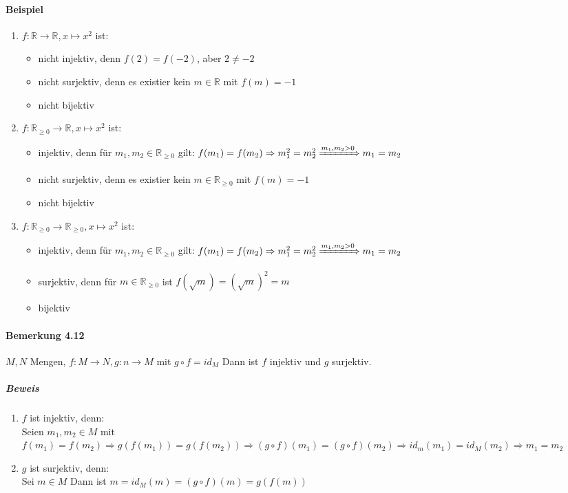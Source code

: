 \documentclass[a4paper]{scrartcl}
\theoremstyle{definition}
\theoremstyle{plain}
\theoremstyle{plain}
\theoremstyle{remark}
\theoremstyle{remark}
\theoremstyle{remark}
\begin{document}
\paragraph{Beispiel}
\label{sec-2-6-7-4}
\begin{enumerate}
\item $f:\mathbb{R}\to\mathbb{R},x\mapsto x^2$ ist:
\begin{itemize}
\item nicht injektiv, denn $f(2) = f(-2)$, aber $2\neq -2$
\item nicht surjektiv, denn es existier kein $m\in\mathbb{R}$ mit $f(m) = -1$
\item nicht bijektiv
\end{itemize}
\item $f:\mathbb{R}_{\geq 0} \to \mathbb{R}, x\mapsto x^2$ ist:
\begin{itemize}
\item injektiv, denn für $m_1,m_2 \in\mathbb{R}_{\geq 0}$ gilt: $f(m_1) = f(m_2) \Rightarrow m_1^2 = m_2^2 \xRightarrow{m_1,m_2 > 0} m_1 = m_2$
\item nicht surjektiv, denn es existier kein $m\in\mathbb{R}_{\geq 0}$ mit $f(m) = -1$
\item nicht bijektiv
\end{itemize}
\item $f:\mathbb{R}_{\geq 0} \to \mathbb{R}_{\geq 0}, x\mapsto x^2$ ist:
\begin{itemize}
\item injektiv, denn für $m_1,m_2 \in\mathbb{R}_{\geq 0}$ gilt: $f(m_1) = f(m_2) \Rightarrow m_1^2 = m_2^2 \xRightarrow{m_1,m_2 > 0} m_1 = m_2$
\item surjektiv, denn für $m\in\mathbb{R}_{\geq 0}$ ist $f(\sqrt{m}) = (\sqrt{m})^2 = m$
\item bijektiv
\end{itemize}
\end{enumerate}
\paragraph{Bemerkung 4.12}
\label{sec-2-6-7-5}
$M,N$ Mengen, $f:M\to N, g:n\to M$ mit $g\circ f = id_M$
Dann ist $f$ injektiv und $g$ surjektiv.
\subparagraph{Beweis}
\label{sec-2-6-7-5-1}
\begin{enumerate}
\item $f$ ist injektiv, denn: \\
         Seien $m_1, m_2 \in M$ mit $f(m_1) = f(m_2) \Rightarrow g(f(m_1)) = g(f(m_2)) \Rightarrow (g\circ f)(m_1) = (g\circ f)(m_2) \Rightarrow id_m(m_1) = id_M(m_2)\Rightarrow m_1 = m_2$
\item $g$ ist surjektiv, denn: \\
         Sei $m\in M$ Dann ist $m=id_M(m) = (g\circ f)(m) = g(f(m))$
\end{enumerate}
\end{document}

